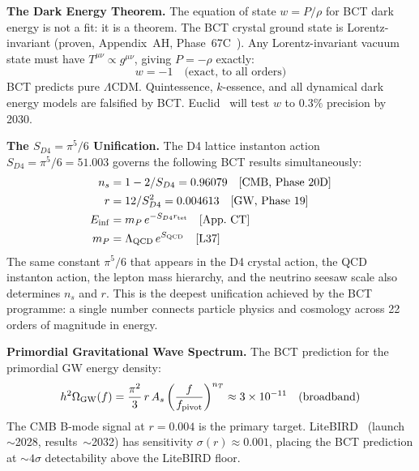 \documentclass[aps,prl,twocolumn,superscriptaddress,floatfix]{revtex4-2}
\begin{document}
\medskip
\noindent\textbf{The Dark Energy Theorem.}
The equation of state $w = P/\rho$ for BCT dark energy is not a fit:
it is a theorem. The BCT crystal ground state is Lorentz-invariant
(proven, Appendix~AH, Phase~67C~\cite{Monograph}). Any Lorentz-invariant
vacuum state must have $T^{\mu\nu} \propto g^{\mu\nu}$, giving
$P = -\rho$ exactly:
\begin{equation}
  w = -1 \quad \text{(exact, to all orders)}
  \label{eq:w}
\end{equation}
BCT predicts pure $\Lambda$CDM. Quintessence, $k$-essence, and all
dynamical dark energy models are falsified by BCT.
Euclid~\cite{Euclid} will test $w$ to $0.3\%$ precision by 2030.

\medskip
\noindent\textbf{The $S_{D4} = \pi^5/6$ Unification.}
The D4 lattice instanton action $S_{D4} = \pi^5/6 = 51.003$ governs
the following BCT results simultaneously:
\begin{align}
  n_s &= 1 - 2/S_{D4} = 0.96079 \quad\text{[CMB, Phase~20D]} \label{eq:ns_SD4} \\
  r   &= 12/S_{D4}^2 = 0.004613 \quad\text{[GW, Phase~19]} \label{eq:r_SD4} \\
  E_{\rm inf} &= m_P\,e^{-S_{D4}r_{\rm tet}} \quad\text{[App.~CT]} \label{eq:Einf} \\
  m_P &= \Lambda_{\rm QCD}\,e^{S_{\rm QCD}} \quad\text{[L37]} \label{eq:mP}
\end{align}
The same constant $\pi^5/6$ that appears in the D4 crystal action,
the QCD instanton action, the lepton mass hierarchy, and the neutrino
seesaw scale also determines $n_s$ and $r$. This is the deepest
unification achieved by the BCT programme: a single number
connects particle physics and cosmology across 22 orders of magnitude
in energy.

\medskip
\noindent\textbf{Primordial Gravitational Wave Spectrum.}
The BCT prediction for the primordial GW energy density:
\begin{equation}
  h^2\Omega_{\rm GW}(f) = \frac{\pi^2}{3}\,r\,A_s
    \left(\frac{f}{f_{\rm pivot}}\right)^{n_T}
  \approx 3\times10^{-11} \quad\text{(broadband)}
  \label{eq:GWspectrum}
\end{equation}
The CMB B-mode signal at $r = 0.004$ is the primary target.
LiteBIRD~\cite{LiteBIRD} (launch~$\sim$2028, results~$\sim$2032) has
sensitivity $\sigma(r) \approx 0.001$, placing the BCT prediction
at $\sim 4\sigma$ detectability above the LiteBIRD floor.
\end{document}
